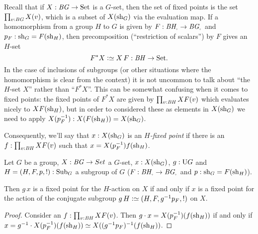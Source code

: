 Recall that if $X:\mathit{B}\mathit{G}\to\mathrm{Set}$ is a $G$-set, then the set of fixed points is the set $\prod_{v:\mathit{B}\mathit{G}}X(v)$, which is a subset of $X(\mathrm{sh}_G)$ via the evaluation map.  If a homomorphism from a group $H$ to $G$ is given by $F:\BH_\div\to \BG_\div$ and $p_F:\mathrm{sh}_G=F(\mathrm{sh}_H)$, then precomposition (``restriction of scalars'') by $F$ gives an $H$-set 
$$F^*X\defequi X\,F:\BH\to\Set.$$  
In the case of inclusions of subgroups (or other situations where the homomorphism is clear from the context) it is not uncommon to talk about ``the $H$-set $X$'' rather than ``$F^*X$''.  
This can be somewhat confusing when it comes to fixed points: the fixed points of $F^*X$ are given by $\prod_{v:\mathit{B}\mathit{H}}XF(v)$ which evaluates nicely to $XF(\mathrm{sh}_H)$, but in order to considered  these as elements in $X(\mathrm{sh}_G)$ we need to apply $X(p_F^{-1}):X(F(\mathrm{sh}_H))=X(\mathrm{sh}_G)$.  

Consequently, we'll say that $x:X(\mathrm{sh}_G)$ is an \emph{$H$-fixed point} if there is an $f:\prod_{v:\mathit{B}\mathit{H}}XF(v)$ such that $x=X(p_F^{-1})f(\mathrm{sh}_H)$.



\begin{lemma}
  \label{lem:thereisaconjugate}
  Let $G$ be a group, $X:\mathit{B}\mathit{G}\to Set$ a $G$-set, $x:X(\mathrm{sh}_G)$, $g:\mathrm{U} G$ and $H=(H,F,p,!):\mathrm{Sub}_G$ a subgroup of $G$ ($F:\BH_\div\to \BG_\div$ and $p:\mathrm{sh}_G=F(\mathrm{sh}_H)$).  

Then $g\,x$ is a fixed point for the $H$-action on $X$ if and only if $x$ is a fixed point for the action  of the conjugate subgroup $g\,H\defequi(H,F,g^{-1}p_F,!)$ on $X$.
\end{lemma}
\begin{proof}
  Consider an $f:\prod_{v:\mathit{B}\mathit{H}}XF(v)$.  Then $g\cdot x=X(p_F^{-1})(f(\mathrm{sh}_H))$ if and only if $x=g^{-1}\cdot X(p_F^{-1})(f(\sh_H))\oldequiv X((g^{-1}p_F)^{-1}(f(\sh_H))$.
\end{proof}





